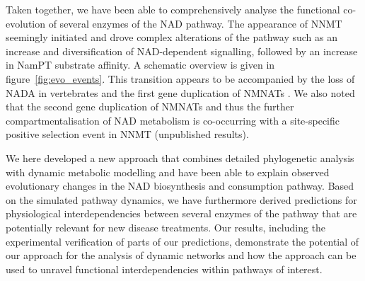 
Taken together, we have been able to comprehensively analyse the functional co-evolution of several enzymes of the NAD pathway. The appearance of NNMT seemingly initiated and drove complex alterations of the pathway such as an increase and diversification of NAD-dependent signalling, followed by an increase in NamPT substrate affinity. A schematic overview is given in figure~\ref{fig:evo_events}. This transition appears to be accompanied by the loss of NADA in vertebrates and the first gene duplication of NMNATs \cite{Lau2010}. We also noted that the second gene duplication of NMNATs and thus the further compartmentalisation of NAD metabolism is co-occurring with a site-specific positive selection event in NNMT (unpublished results).

We here developed a new approach that combines detailed phylogenetic analysis with dynamic metabolic modelling and have been able to explain observed evolutionary changes in the NAD biosynthesis and consumption pathway. Based on the simulated pathway dynamics, we have furthermore derived predictions for physiological interdependencies between several enzymes of the pathway that are potentially relevant for new disease treatments. Our results, including the experimental verification of parts of our predictions, demonstrate the potential of our approach for the analysis of dynamic networks and how the approach can be used to unravel functional interdependencies within pathways of interest.
